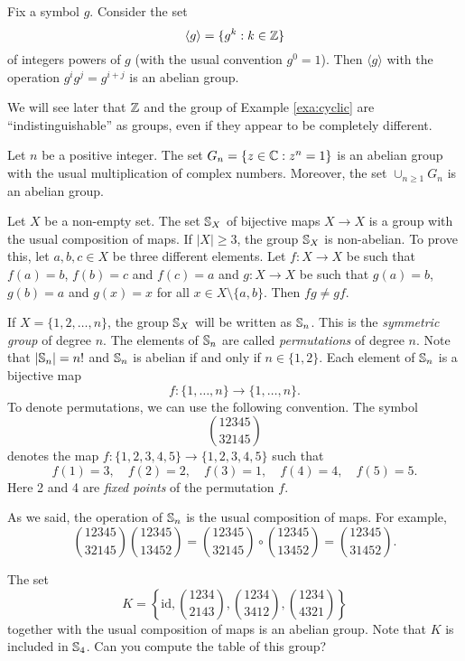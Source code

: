 \begin{example}
\label{exa:cyclic}
Fix a symbol $g$. Consider the set  
\[
\langle g\rangle=\{g^k:k\in\mathbb{Z}\}
\]
of integers powers of $g$ (with the usual convention $g^0=1$). Then
$\langle g\rangle$
with the operation $g^ig^j=g^{i+j}$ is an abelian group. 
\end{example}

We will see later that $\mathbb{Z}$ and the group of 
Example \ref{exa:cyclic} are ``indistinguishable'' 
as groups, even if they appear to be completely different. 

\begin{example}
Let $n$ be a positive integer. The set 
$G_n=\{z\in\mathbb{C}:z^n=1\}$ is an abelian group with
the usual multiplication of complex numbers. Moreover, the set 
$\cup_{n\geq1}G_n$ is an abelian group. 
\end{example}

\begin{example}
    Let $X$ be a non-empty set. The set $\mathbb{S}_X$ of bijective maps $X\to X$ 
    is a group with the usual composition of maps. If $|X|\geq3$, the group
    $\mathbb{S}_{X}$ is non-abelian. To prove this, let $a,b,c\in
        X$ be three different elements. Let $f\colon X\to X$ be such that
        $f(a)=b$, $f(b)=c$ and $f(c)=
a$ and $g\colon X\to
        X$ be such that $g(a)=b$, $g(b)=a$ and $g(x)=x$ for all $x\in
        X\setminus\{a,b\}$.  Then $fg\ne gf$.
\end{example}

If $X=\{1,2,\dots,n\}$, the group $\mathbb{S}_X$ will be written as $\mathbb{S}_n$. This is
the \emph{symmetric group} of degree $n$. The elements of $\mathbb{S}_n$ are
called \emph{permutations} of degree $n$. 
Note that $|\mathbb{S}_n|=n!$ and $\mathbb{S}_n$
is abelian if and only if $n\in\{1,2\}$. Each element of $\mathbb{S}_n$ is a 
bijective map 
\[
f\colon\{1,\dots,n\}\to \{1,\dots,n\}.
\]
To denote permutations, 
we can use the following convention. The symbol  
\[
\binom{12345}{32145}
\]
denotes the map 
$f\colon\{1,2,3,4,5\}\to\{1,2,3,4,5\}$ such that 
\[
f(1)=3,
\quad f(2)=2,
\quad f(3)=1, 
\quad f(4)=4,
\quad f(5)=5.
\]
Here 2 and 4 are \emph{fixed points} of the permutation $f$. 

As we said, the operation of $\mathbb{S}_n$ is the usual
composition of maps. 
For example, 
\[
\binom{12345}{32145}
\binom{12345}{13452}
=
\binom{12345}{32145}
\circ 
\binom{12345}{13452}
=\binom{12345}{31452}.
\]

\begin{example}
The set  
\[
K=\left\{ \mathrm{id},\binom{1234}{2143},\binom{1234}{3412},\binom{1234}{4321}\right\}
\]
together with the usual composition of maps is an abelian group. 
Note that $K$ is included in $\mathbb{S}_{4}$.
Can you compute the table of this group?
\end{example}


